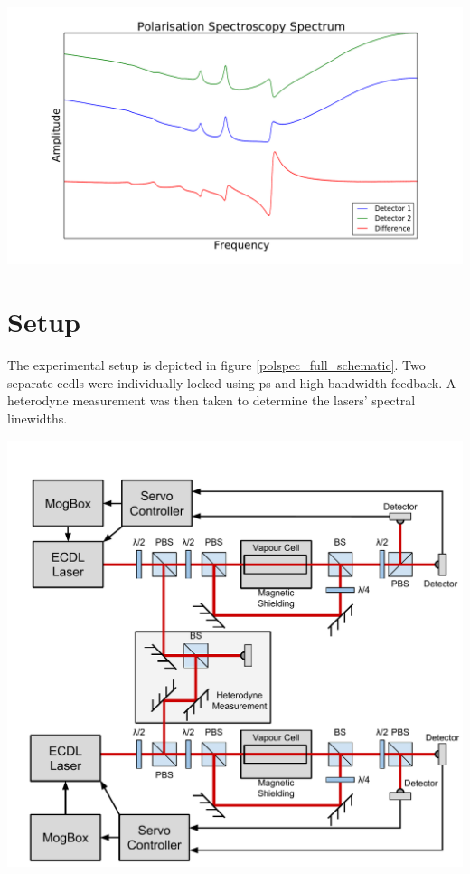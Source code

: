 \documentclass{article}
\newenvironment{Figure}
  {\par\medskip\noindent\minipage{\linewidth}}
  {\endminipage\par\medskip}
\begin{document}
\begin{multicols}{2}
\begin{Figure}
    \centering
    \captionsetup{type=figure}
    \includegraphics[width=\linewidth]{Figs/spectrum.pdf}
    \label{polspec_spectrum}
\end{Figure}

\section{Setup}

The experimental setup is depicted in figure \ref{polspec_full_schematic}. Two separate \glspl{ecdl} were individually locked using \gls{ps} and high bandwidth feedback. A heterodyne measurement was then taken to determine the lasers' spectral linewidths.

\begin{Figure}
    \centering
    \captionsetup{type=figure}
    \includegraphics[width=\linewidth]{Figs/FullSimplifiedPolSpecSchematicAttempt.pdf}
    \label{polspec_full_schematic}
\end{Figure}


\end{multicols}
\end{document}

